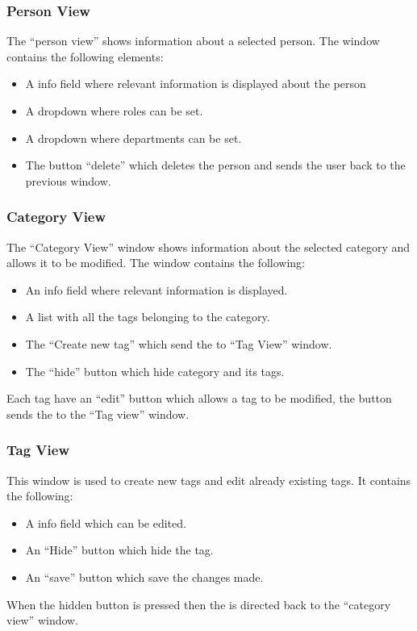 \subsubsection{Person View}
The ``person view'' shows information about a selected person.
The window contains the following elements:
\begin{itemize}
	\item A info field where relevant information is displayed about the person
	\item A dropdown where roles can be set.
	\item A dropdown where departments can be set.
	\item The button ``delete'' which deletes the person and sends the user back to the previous window. 
\end{itemize}

\subsubsection{Category View}
The ``Category View'' window shows information about the selected category and allows it to be modified. The window contains the following: 

\begin{itemize}
	\item An info field where relevant information is displayed.
	\item A list with all the tags belonging to the category.
	\item The ``Create new tag'' which send the \admin[] to ``Tag View'' window.
	\item The ``hide'' button which hide category and its tags. 
\end{itemize}
Each tag have an ``edit'' button which allows a tag to be modified, the button sends the \admin[] to the ``Tag view'' window. 

\subsubsection{Tag View}
This window is used to create new tags and edit already existing tags.
It contains the following:
\begin{itemize}
	\item A info field which can be edited.
	\item An ``Hide'' button which hide the tag.
	\item An ``save'' button which save the changes made.
\end{itemize}
When the hidden button is pressed then the \admin[] is directed back to the ``category view'' window.

